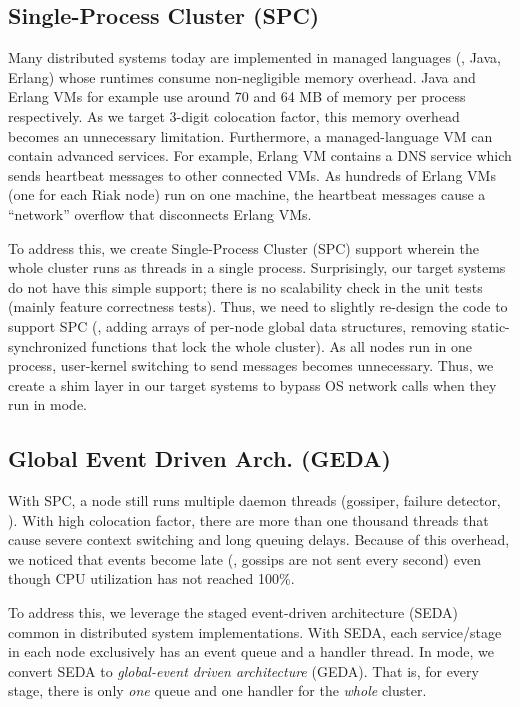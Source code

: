 
\subsection{Single-Process Cluster (SPC)}
\label{sc-spc}

Many distributed systems today are implemented in managed languages (\eg,
Java, Erlang) whose runtimes consume non-negligible memory overhead.
Java and Erlang VMs for example use around 70 and 64 MB of memory 
  per process respectively.  As we target 3-digit colocation factor, this
memory overhead becomes an unnecessary limitation.
%
Furthermore, a managed-language VM can contain advanced services.  For
example, Erlang VM contains a DNS service which sends heartbeat messages
to other connected VMs.  As hundreds of Erlang VMs (one for each Riak
node) run on one machine, the heartbeat messages cause a ``network''
overflow that disconnects Erlang VMs.


To address this, we create Single-Process Cluster (SPC) support
wherein the whole cluster runs as threads in a single process.
Surprisingly, our target systems do not have this simple support; there is
no scalability check in the unit tests (mainly feature correctness
tests).  Thus, we need to slightly re-design the code to support SPC (\eg,
adding arrays of per-node global data structures, removing 
static-synchronized
functions that lock the whole cluster).
%
As all nodes run in one process, user-kernel switching to
send messages becomes unnecessary.  Thus, we create a shim layer in our
target systems to bypass OS network calls when they run in \sck mode.






\subsection{Global Event Driven Arch. (GEDA)}
\label{sc-geda}



With SPC, a node still runs multiple daemon threads (gossiper, failure
detector, \etc).  With high colocation factor, there are more than one
thousand threads that cause  severe context switching and long queuing
delays.  Because of this overhead, we noticed that events become late
(\eg, gossips are not sent every second) even though CPU 
utilization has not reached 100\%.

To address this, we leverage the staged event-driven architecture (SEDA)
\cite{Welsh+01-Seda} common in distributed system implementations.  
With SEDA, each
service/stage in each node exclusively has an event queue and a handler
thread.  In \sck mode, we convert SEDA to {\em global-event driven
  architecture} (GEDA).  That is, for every stage, there is only {\em one}
queue and one handler for the {\em whole} cluster.


